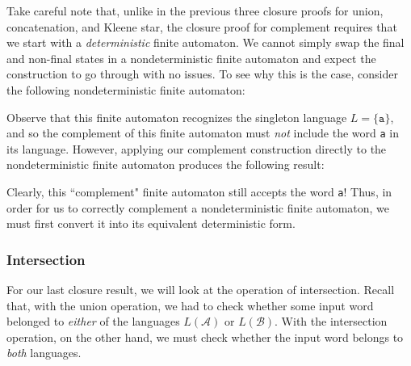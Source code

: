 Take careful note that, unlike in the previous three closure proofs for union, concatenation, and Kleene star, the closure proof for complement requires that we start with a \emph{deterministic} finite automaton. We cannot simply swap the final and non-final states in a nondeterministic finite automaton and expect the construction to go through with no issues. To see why this is the case, consider the following nondeterministic finite automaton:
\begin{center}
\end{center}
Observe that this finite automaton recognizes the singleton language $L = \{\texttt{a}\}$, and so the complement of this finite automaton must \emph{not} include the word \texttt{a} in its language. However, applying our complement construction directly to the nondeterministic finite automaton produces the following result:
\begin{center}
\end{center}
Clearly, this ``complement" finite automaton still accepts the word \texttt{a}! Thus, in order for us to correctly complement a nondeterministic finite automaton, we must first convert it into its equivalent deterministic form.

\subsubsection*{Intersection}

For our last closure result, we will look at the operation of intersection. Recall that, with the union operation, we had to check whether some input word belonged to \emph{either} of the languages $L(\mathcal{A})$ or $L(\mathcal{B})$. With the intersection operation, on the other hand, we must check whether the input word belongs to \emph{both} languages.

